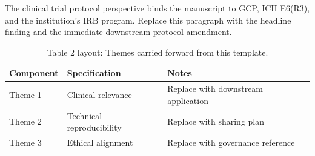 
The clinical trial protocol perspective binds the manuscript to GCP, ICH E6(R3), and the institution's IRB program. Replace this paragraph with the headline finding and the immediate downstream protocol amendment.

\begin{table}[H]
\caption{Table 2 layout: Themes carried forward from this template.}
\label{tab:conclusions_themes}
\centering
\begin{tabular}{>{\raggedright\arraybackslash}p{3.4cm} >{\raggedright\arraybackslash}p{4.6cm} >{\raggedright\arraybackslash}p{5.4cm}}
\toprule
\textbf{Component} & \textbf{Specification} & \textbf{Notes} \\
\midrule
  Theme 1 & Clinical relevance & Replace with downstream application \\
  Theme 2 & Technical reproducibility & Replace with sharing plan \\
  Theme 3 & Ethical alignment & Replace with governance reference \\
\bottomrule
\end{tabular}
\end{table}
